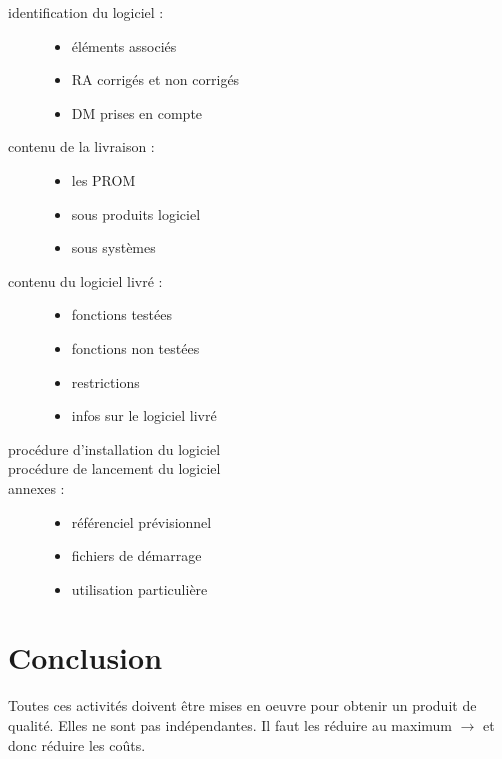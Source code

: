 \begin{description}
	\item[identification du logiciel :]
	\begin{itemize}
		\item éléments associés
		\item RA corrigés et non corrigés
		\item DM prises en compte
	\end{itemize}

	\item[contenu de la livraison :]
	\begin{itemize}
		\item les PROM
		\item sous produits logiciel
		\item sous systèmes
	\end{itemize}

	\item[contenu du logiciel livré :]
	\begin{itemize}
		\item fonctions testées
		\item fonctions non testées
		\item restrictions
		\item infos sur le logiciel livré
	\end{itemize}

	\item[procédure d’installation du logiciel]

	\item[procédure de lancement du logiciel]

	\item[annexes :]
	\begin{itemize}
		\item référenciel prévisionnel
		\item fichiers de démarrage
		\item utilisation particulière
	\end{itemize}
\end{description}

\section{Conclusion}

Toutes ces activités doivent être mises en oeuvre pour obtenir un produit de qualité. Elles ne sont pas indépendantes. Il faut les réduire au maximum $\rightarrow$ et donc réduire les coûts.
